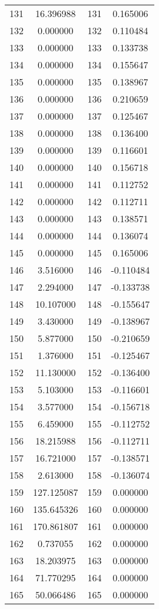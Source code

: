 \documentclass[12pt]{article}
\begin{document}
\begin{longtable}{@{}cccc@{}}
131 & 16.396988 & 131 & 0.165006 \\
132 & 0.000000 & 132 & 0.110484 \\
133 & 0.000000 & 133 & 0.133738 \\
134 & 0.000000 & 134 & 0.155647 \\
135 & 0.000000 & 135 & 0.138967 \\
136 & 0.000000 & 136 & 0.210659 \\
137 & 0.000000 & 137 & 0.125467 \\
138 & 0.000000 & 138 & 0.136400 \\
139 & 0.000000 & 139 & 0.116601 \\
140 & 0.000000 & 140 & 0.156718 \\
141 & 0.000000 & 141 & 0.112752 \\
142 & 0.000000 & 142 & 0.112711 \\
143 & 0.000000 & 143 & 0.138571 \\
144 & 0.000000 & 144 & 0.136074 \\
145 & 0.000000 & 145 & 0.165006 \\
146 & 3.516000 & 146 & -0.110484 \\
147 & 2.294000 & 147 & -0.133738 \\
148 & 10.107000 & 148 & -0.155647 \\
149 & 3.430000 & 149 & -0.138967 \\
150 & 5.877000 & 150 & -0.210659 \\
151 & 1.376000 & 151 & -0.125467 \\
152 & 11.130000 & 152 & -0.136400 \\
153 & 5.103000 & 153 & -0.116601 \\
154 & 3.577000 & 154 & -0.156718 \\
155 & 6.459000 & 155 & -0.112752 \\
156 & 18.215988 & 156 & -0.112711 \\
157 & 16.721000 & 157 & -0.138571 \\
158 & 2.613000 & 158 & -0.136074 \\
159 & 127.125087 & 159 & 0.000000 \\
160 & 135.645326 & 160 & 0.000000 \\
161 & 170.861807 & 161 & 0.000000 \\
162 & 0.737055 & 162 & 0.000000 \\
163 & 18.203975 & 163 & 0.000000 \\
164 & 71.770295 & 164 & 0.000000 \\
165 & 50.066486 & 165 & 0.000000 \\

\end{longtable}
\end{document}
